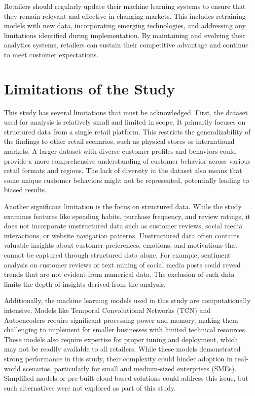 \documentclass[12pt, a4paper,twoside]{report}
\theoremstyle{plain} %
\theoremstyle{definition} %
\theoremstyle{remark} %
\numberwithin{equation}{chapter}
\begin{document}
Retailers should regularly update their machine learning systems to ensure that they remain relevant and effective in changing markets. This includes retraining models with new data, incorporating emerging technologies, and addressing any limitations identified during implementation. By maintaining and evolving their analytics systems, retailers can sustain their competitive advantage and continue to meet customer expectations.



\section{Limitations of the Study}

This study has several limitations that must be acknowledged. First, the dataset used for analysis is relatively small and limited in scope. It primarily focuses on structured data from a single retail platform. This restricts the generalizability of the findings to other retail scenarios, such as physical stores or international markets. A larger dataset with diverse customer profiles and behaviors could provide a more comprehensive understanding of customer behavior across various retail formats and regions. The lack of diversity in the dataset also means that some unique customer behaviors might not be represented, potentially leading to biased results.

Another significant limitation is the focus on structured data. While the study examines features like spending habits, purchase frequency, and review ratings, it does not incorporate unstructured data such as customer reviews, social media interactions, or website navigation patterns. Unstructured data often contains valuable insights about customer preferences, emotions, and motivations that cannot be captured through structured data alone. For example, sentiment analysis on customer reviews or text mining of social media posts could reveal trends that are not evident from numerical data. The exclusion of such data limits the depth of insights derived from the analysis.

Additionally, the machine learning models used in this study are computationally intensive. Models like Temporal Convolutional Networks (TCN) and Autoencoders require significant processing power and memory, making them challenging to implement for smaller businesses with limited technical resources. These models also require expertise for proper tuning and deployment, which may not be readily available to all retailers. While these models demonstrated strong performance in this study, their complexity could hinder adoption in real-world scenarios, particularly for small and medium-sized enterprises (SMEs). Simplified models or pre-built cloud-based solutions could address this issue, but such alternatives were not explored as part of this study.
\end{document}
